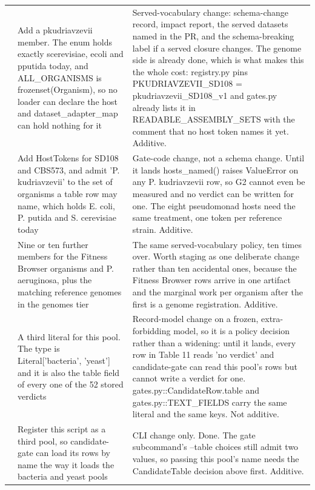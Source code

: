 \begin{longtable}{@{}L{50mm} L{48mm} L{74mm}@{}}
\addlinespace[5pt]
 & Add a pkudriavzevii member. The enum holds exactly scerevisiae, ecoli and pputida today, and ALL\_ORGANISMS is frozenset(Organism), so no loader can declare the host and dataset\_adapter\_map can hold nothing for it & Served-vocabulary change: schema-change record, impact report, the served datasets named in the PR, and the schema-breaking label if a served closure changes. The genome side is already done, which is what makes this the whole cost: registry.py pins PKUDRIAVZEVII\_SD108 = pkudriavzevii\_SD108\_v1 and gates.py already lists it in READABLE\_ASSEMBLY\_SETS with the comment that no host token names it yet. Additive. \\
\addlinespace[5pt]
 & Add HostTokens for SD108 and CBS573, and admit 'P. kudriavzevii' to the set of organisms a table row may name, which holds E. coli, P. putida and S. cerevisiae today & Gate-code change, not a schema change. Until it lands hosts\_named() raises ValueError on any P. kudriavzevii row, so G2 cannot even be measured and no verdict can be written for one. The eight pseudomonad hosts need the same treatment, one token per reference strain. Additive. \\
\addlinespace[5pt]
 & Nine or ten further members for the Fitness Browser organisms and P. aeruginosa, plus the matching reference genomes in the genomes tier & The same served-vocabulary policy, ten times over. Worth staging as one deliberate change rather than ten accidental ones, because the Fitness Browser rows arrive in one artifact and the marginal work per organism after the first is a genome registration. Additive. \\
\addlinespace[5pt]
 & A third literal for this pool. The type is Literal['bacteria', 'yeast'] and it is also the table field of every one of the 52 stored verdicts & Record-model change on a frozen, extra-forbidding model, so it is a policy decision rather than a widening: until it lands, every row in Table 11 reads 'no verdict' and candidate-gate can read this pool's rows but cannot write a verdict for one. gates.py::CandidateRow.table and gates.py::TEXT\_FIELDS carry the same literal and the same keys. Not additive. \\
\addlinespace[5pt]
 & Register this script as a third pool, so candidate-gate can load its rows by name the way it loads the bacteria and yeast pools & CLI change only. Done. The gate subcommand's --table choices still admit two values, so passing this pool's name needs the CandidateTable decision above first. Additive. \\

\end{longtable}

